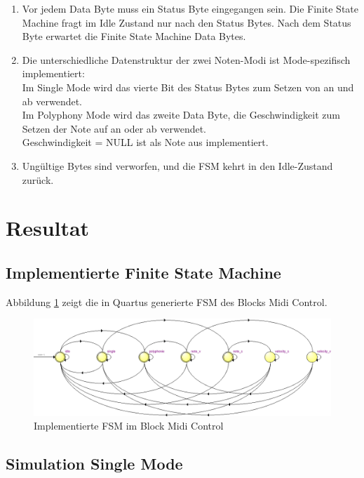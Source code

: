 \begin{enumerate}
\item Vor jedem Data Byte muss ein Status Byte eingegangen sein. Die Finite State Machine fragt im Idle Zustand nur nach den Status Bytes. Nach dem Status Byte erwartet die Finite State Machine Data Bytes. 
\item Die unterschiedliche Datenstruktur der zwei Noten-Modi ist Mode-spezifisch implementiert:\\
Im Single Mode wird das vierte Bit des Status Bytes zum Setzen von an und ab verwendet.\\
Im Polyphony Mode wird das zweite Data Byte, die Geschwindigkeit zum Setzen der Note auf an oder ab verwendet.\\
Geschwindigkeit = NULL ist als Note aus implementiert.
\item Ungültige Bytes sind verworfen, und die FSM kehrt in den Idle-Zustand zurück.
\end{enumerate}

\newpage
\section{Resultat}\label{sect.midi_resultat}

\subsection{Implementierte Finite State Machine}

Abbildung \ref{fig.midi_fsm_quartus_} zeigt die in Quartus generierte FSM des Blocks Midi Control.

\begin{figure}[H]
	\includegraphics[width=1\textwidth]{images/midi_control/fsm_midicontrol.png}
	\caption{Implementierte FSM im Block Midi Control}
	\label{fig.midi_fsm_quartus_}
\end{figure}

\subsection{Simulation Single Mode}


